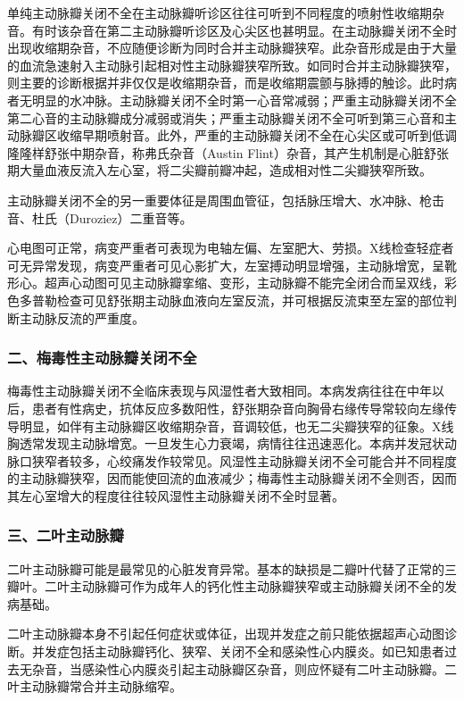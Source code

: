 单纯主动脉瓣关闭不全在主动脉瓣听诊区往往可听到不同程度的喷射性收缩期杂音。有时该杂音在第二主动脉瓣听诊区及心尖区也甚明显。在主动脉瓣关闭不全时出现收缩期杂音，不应随便诊断为同时合并主动脉瓣狭窄。此杂音形成是由于大量的血流急速射入主动脉引起相对性主动脉瓣狭窄所致。如同时合并主动脉瓣狭窄，则主要的诊断根据并非仅仅是收缩期杂音，而是收缩期震颤与脉搏的触诊。此时病者无明显的水冲脉。主动脉瓣关闭不全时第一心音常减弱；严重主动脉瓣关闭不全第二心音的主动脉瓣成分减弱或消失；严重主动脉瓣关闭不全可听到第三心音和主动脉瓣区收缩早期喷射音。此外，严重的主动脉瓣关闭不全在心尖区或可听到低调隆隆样舒张中期杂音，称弗氏杂音（Austin
Flint）杂音，其产生机制是心脏舒张期大量血液反流入左心室，将二尖瓣前瓣冲起，造成相对性二尖瓣狭窄所致。

主动脉瓣关闭不全的另一重要体征是周围血管征，包括脉压增大、水冲脉、枪击音、杜氏（Duroziez）二重音等。

心电图可正常，病变严重者可表现为电轴左偏、左室肥大、劳损。X线检查轻症者可无异常发现，病变严重者可见心影扩大，左室搏动明显增强，主动脉增宽，呈靴形心。超声心动图可见主动脉瓣挛缩、变形，主动脉瓣不能完全闭合而呈双线，彩色多普勒检查可见舒张期主动脉血液向左室反流，并可根据反流束至左室的部位判断主动脉反流的严重度。

\subsubsection{二、梅毒性主动脉瓣关闭不全}

梅毒性主动脉瓣关闭不全临床表现与风湿性者大致相同。本病发病往往在中年以后，患者有性病史，抗体反应多数阳性，舒张期杂音向胸骨右缘传导常较向左缘传导明显，如伴有主动脉瓣区收缩期杂音，音调较低，也无二尖瓣狭窄的征象。X线胸透常发现主动脉增宽。一旦发生心力衰竭，病情往往迅速恶化。本病并发冠状动脉口狭窄者较多，心绞痛发作较常见。风湿性主动脉瓣关闭不全可能合并不同程度的主动脉瓣狭窄，因而能使回流的血液减少；梅毒性主动脉瓣关闭不全则否，因而其左心室增大的程度往往较风湿性主动脉瓣关闭不全时显著。

\subsubsection{三、二叶主动脉瓣}

二叶主动脉瓣可能是最常见的心脏发育异常。基本的缺损是二瓣叶代替了正常的三瓣叶。二叶主动脉瓣可作为成年人的钙化性主动脉瓣狭窄或主动脉瓣关闭不全的发病基础。

二叶主动脉瓣本身不引起任何症状或体征，出现并发症之前只能依据超声心动图诊断。并发症包括主动脉瓣钙化、狭窄、关闭不全和感染性心内膜炎。如已知患者过去无杂音，当感染性心内膜炎引起主动脉瓣区杂音，则应怀疑有二叶主动脉瓣。二叶主动脉瓣常合并主动脉缩窄。

